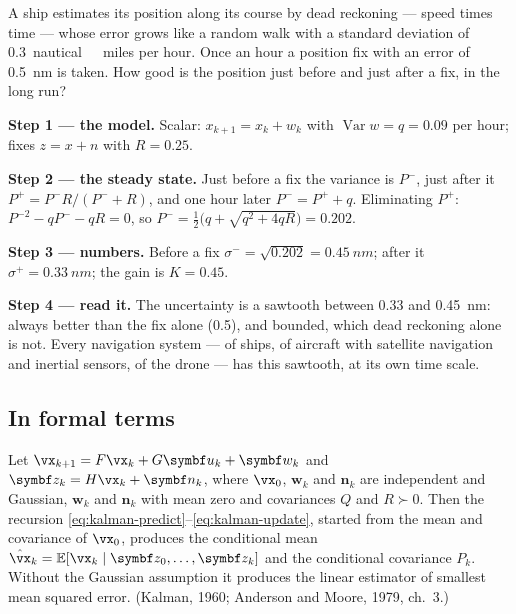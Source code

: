 \begin{example}
\label{ex:kalman-ship}
A ship estimates its position along its course by dead reckoning — speed times time — whose error grows like a random walk with a standard deviation of \SI{0.3}{nautical\ miles} per hour. Once an hour a position fix with an error of \SI{0.5}{nm} is taken. How good is the position just before and just after a fix, in the long run?

\textbf{Step 1 — the model.} Scalar: $x_{k+1} = x_k + w_k$ with $\operatorname{Var}w = q = 0.09$ per hour; fixes $z = x + n$ with $R = 0.25$.

\textbf{Step 2 — the steady state.} Just before a fix the variance is $P^-$, just after it $P^+ = P^-R/(P^- + R)$, and one hour later $P^- = P^+ + q$. Eliminating $P^+$: $P^{-2} - qP^- - qR = 0$, so $P^- = \tfrac12\big(q + \sqrt{q^2 + 4qR}\big) = 0.202$.

\textbf{Step 3 — numbers.} Before a fix $\sigma^- = \sqrt{0.202} = \SI{0.45}{nm}$; after it $\sigma^+ = \SI{0.33}{nm}$; the gain is $K = 0.45$.

\textbf{Step 4 — read it.} The uncertainty is a sawtooth between 0.33 and \SI{0.45}{nm}: always better than the fix alone (0.5), and bounded, which dead reckoning alone is not. Every navigation system — of ships, of aircraft with satellite navigation and inertial sensors, of the drone — has this sawtooth, at its own time scale.
\end{example}

\subsection{In formal terms}

\begin{theorem}
\label{thm:kalman-filter}
Let $\vx_{k+1} = F\vx_k + G\symbf u_k + \symbf w_k$ and $\symbf z_k = H\vx_k + \symbf n_k$, where $\vx_0$, $\symbf w_k$ and $\symbf n_k$ are independent and Gaussian, $\symbf w_k$ and $\symbf n_k$ with mean zero and covariances $Q$ and $R \succ 0$. Then the recursion \eqref{eq:kalman-predict}–\eqref{eq:kalman-update}, started from the mean and covariance of $\vx_0$, produces the conditional mean $\hat{\vx}_k = \mathbb{E}[\vx_k \mid \symbf z_0, \dots, \symbf z_k]$ and the conditional covariance $P_k$. Without the Gaussian assumption it produces the linear estimator of smallest mean squared error. (Kalman, 1960; Anderson and Moore, 1979, ch.~3.)
\end{theorem}

